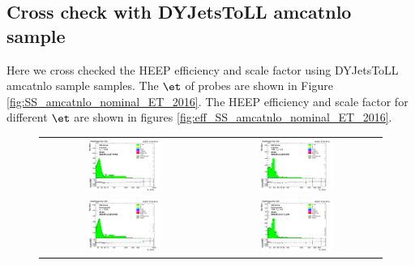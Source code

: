 \subsection{Cross check with DYJetsToLL amcatnlo sample}
\label{AppHEEPsf_amcatnlo_2016}
Here we cross checked the HEEP efficiency and scale factor using DYJetsToLL amcatnlo sample
samples. The $\et$  of probes are shown in Figure \ref{fig:SS_amcatnlo_nominal_ET_2016}. The HEEP efficiency and scale factor for different $\et$ are shown in figures \ref{fig:eff_SS_amcatnlo_nominal_ET_2016}.

\begin{figure}[bh]
  \begin{center}
    \begin{tabular}{cc}
      \includegraphics[width=0.45\textwidth]{figures/Zprime/2016/ScaleFactor/SameSign/DY_amcatnlo_check/stack_Et_Barrel_probes_PUW.png} &
      \includegraphics[width=0.45\textwidth]{figures/Zprime/2016/ScaleFactor/SameSign/DY_amcatnlo_check/stack_Et_Endcap_probes_PUW.png} \\
      \includegraphics[width=0.45\textwidth]{figures/Zprime/2016/ScaleFactor/SameSign/DY_amcatnlo_check/stack_Et_Barrel_pass_PUW.png} &
      \includegraphics[width=0.45\textwidth]{figures/Zprime/2016/ScaleFactor/SameSign/DY_amcatnlo_check/stack_Et_Endcap_pass_PUW.png} \\

\end{tabular}
\end{center}
\end{figure}
